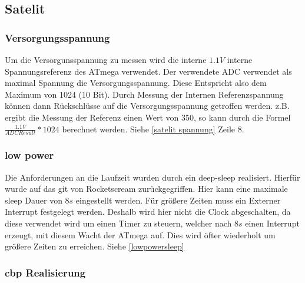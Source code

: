 \subsection{Satelit}

\subsubsection{Versorgungsspannung}
Um die Versorgunsspannung zu messen wird die interne $1.1V$ interne Spannungsreferenz des ATmega verwendet. Der verwendete ADC verwendet als maximal Spannung die Versorgungsspannung. Diese Entspricht also dem Maximum von 1024 (10 Bit). Durch Messung der Internen Referenzspannung können dann Rückschlüsse auf die Versorgungsspannung getroffen werden. 
z.B. ergibt die Messung der Referenz einen Wert von $350$, so kann durch die Formel $\frac{1.1V}{ADC Result} * 1024$ berechnet werden. Siehe \ref{satelit spannung} Zeile 8.
\subsubsection{low power}
Die Anforderungen an die Laufzeit wurden durch ein \grqq deep-sleep \grqq realisiert. Hierfür wurde auf das git von Rocketscream zurückgegriffen\cite{lowpower}. Hier kann eine maximale sleep Dauer von $8s$ eingestellt werden. Für größere Zeiten muss ein Externer Interrupt festgelegt werden. Deshalb wird hier nicht die Clock abgeschalten, da diese verwendet wird um einen Timer zu steuern, welcher nach $8s$ einen Interrupt erzeugt, mit diesem Wacht der ATmega auf. Dies wird öfter wiederholt um größere Zeiten zu erreichen. Siehe \ref{lowpowersleep}
\subsubsection{cbp Realisierung}

